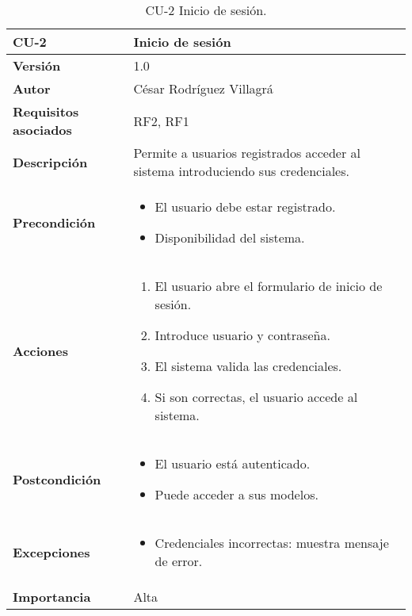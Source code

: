 \begin{table}[p]
	\centering
	\begin{tabularx}{\linewidth}{ p{} p{} }
		\toprule
		\textbf{CU-2}    & \textbf{Inicio de sesión} \\
		\toprule
		\textbf{Versión}              & 1.0    \\
		\textbf{Autor}                & César Rodríguez Villagrá \\
		\textbf{Requisitos asociados} & RF2, RF1 \\
		\textbf{Descripción}          & Permite a usuarios registrados acceder al sistema introduciendo sus credenciales. \\
		\textbf{Precondición}         & 
		\begin{itemize}
			\item El usuario debe estar registrado.
			\item Disponibilidad del sistema.
		\end{itemize} \\
		\textbf{Acciones}             & 
		\begin{enumerate}
			\item El usuario abre el formulario de inicio de sesión.
			\item Introduce usuario y contraseña.
			\item El sistema valida las credenciales.
			\item Si son correctas, el usuario accede al sistema.
		\end{enumerate} \\
		\textbf{Postcondición}        & 
		\begin{itemize}
			\item El usuario está autenticado.
			\item Puede acceder a sus modelos.
		\end{itemize} \\
		\textbf{Excepciones}          & 
		\begin{itemize}
			\item Credenciales incorrectas: muestra mensaje de error.
		\end{itemize} \\
		\textbf{Importancia}          & Alta \\
		\bottomrule
	\end{tabularx}
	\caption{CU-2 Inicio de sesión.}
\end{table}


